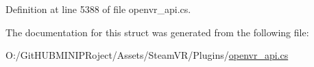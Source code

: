 Definition at line 5388 of file openvr\+\_\+api.\+cs.



The documentation for this struct was generated from the following file\+:\begin{DoxyCompactItemize}
\item 
O\+:/\+Git\+H\+U\+B\+M\+I\+N\+I\+P\+Roject/\+Assets/\+Steam\+V\+R/\+Plugins/\mbox{\hyperlink{openvr__api_8cs}{openvr\+\_\+api.\+cs}}\end{DoxyCompactItemize}
